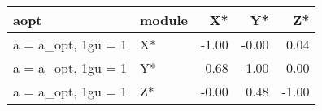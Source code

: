 \documentclass[10pt,a4paper]{article}
\begin{document}
\begin{table}[ht]
\centering
\begin{tabular}{llrrr}
  \hline
aopt & module & X* & Y* & Z* \\ 
  \hline
a = a\_opt, 1gu = 1 & X* & -1.00 & -0.00 & 0.04 \\ 
  a = a\_opt, 1gu = 1 & Y* & 0.68 & -1.00 & 0.00 \\ 
  a = a\_opt, 1gu = 1 & Z* & -0.00 & 0.48 & -1.00 \\ 
   \hline
\end{tabular}
\end{table}
 
\end{document}
